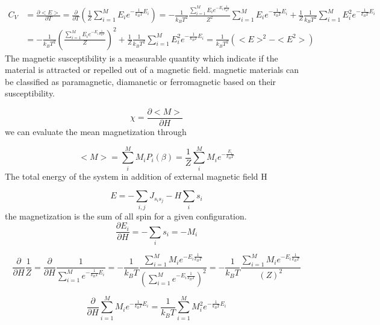 \documentclass[10pt,a4paper]{article}
\begin{document}
\begin{align}
C_V &=\frac{\partial <E>}{\partial T} = \frac{\partial}{\partial T} \left( \frac{1}{Z }\sum_{i=1}^{M}E_i e ^{ - \frac {1}{k_BT} E_i}\right) = -\frac{1}{k_B T^2 } \frac{\sum_{i=1}^{M} E_i e^{-E_i \frac{1}{k_BT}}}{ Z^2}\sum_{i=1}^{M}E_i e ^{ - \frac {1}{k_BT} E_i} +\frac{1}{Z}\frac{1}{k_BT^2}\sum_{i=1}^{M}E_i^2 e ^{ - \frac {1}{k_BT} E_i} \\
 &= -\frac{1}{k_B T^2 } \left( \frac{\sum_{i=1}^{M} E_i e^{-E_i \frac{1}{k_BT}}}{ Z} \right)^2 +\frac{1}{Z}\frac{1}{k_BT^2}\sum_{i=1}^{M}E_i^2 e ^{ - \frac {1}{k_BT} E_i} = \frac{1}{k_B T^2 } \left( <E>^2 - <E^2> \right)
\end{align}
The magnetic susceptibility is a measurable quantity which indicate if the material is attracted or repelled out of a magnetic field.
magnetic materials can be classified as paramagnetic, diamanetic or ferromagnetic based on their susceptibility.

\begin{equation}
\chi =\frac{\partial <M>}{\partial H} 
\end{equation}
we can evaluate the mean magnetization through

\begin{equation}
<M> = \sum_{i}^{M}M_iP_i(\beta)= \frac{1}{Z}\sum_{i}^{M}M_ie^{- \frac{E_i}{k_BT}}
\end{equation}
The total energy of the system in addition of external magnetic field H

\begin{equation}
E = -\sum_{i,j} J_{s_is_j}- H\sum_{i}s_i
\end{equation}
the magnetization is the sum of all spin for a given configuration.
\begin{equation}
\frac{\partial E_i}{\partial H} =- \sum_{i}s_i = -M_i
\end{equation}

\begin{equation}
\frac{\partial}{\partial H}\frac{1}{Z} = \frac{\partial}{\partial H}\frac{1}{\sum_{i=1}^{M}e^{- \frac{1}{k_BT} E_i}} = -\frac{1}{k_B T} \frac{\sum_{i=1}^{M} M_i e^{-E_i \frac{1}{k_BT}}}{\left(\sum_{i=1}^{M} e^{-E_i \frac{1}{k_BT}} \right)^2}=-\frac{1}{k_B T} \frac{\sum_{i=1}^{M} M_i e^{-E_i \frac{1}{k_BT}}}{\left( Z\right)^2}
\end{equation}

\begin{equation}
\frac{\partial}{\partial H}\sum_{i=1}^{M}M_i e ^{ - \frac {1}{k_BT} E_i} = \frac{1}{k_BT}\sum_{i=1}^{M}M_i^2 e ^{ - \frac {1}{k_BT} E_i}
\end{equation}
\end{document}
